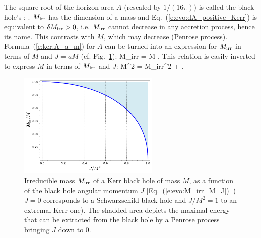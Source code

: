 The square root of the horizon area $A$ (rescaled by $1/(16\pi)$) is called
the black hole's :
\be \label{e:evo:Mirr_A}
    .
\ee
$M_{\rm irr}$ has the dimension of a mass and
Eq.~(\ref{e:evo:dA_positive_Kerr}) is equivalent to $\delta M_{\rm irr} > 0$,
i.e. $M_{\rm irr}$ cannot decrease in any accretion process,
hence its name. This contrasts with $M$, which may decrease (Penrose process).
Formula~(\ref{e:ker:A_a_m}) for $A$ can be turned into an expression
for $M_{\rm irr}$ in terms of $M$ and $J=aM$ (cf. Fig.~\ref{f:evo:irred_mass}):
\be \label{e:evo:M_irr_M_J}
    M_{\rm irr} = M  .
\ee
This relation is easily inverted to express $M$ in terms of $M_{\rm irr}$ and $J$:
\be \label{e:evo:M_M_irr_J}
    M^2 = M_{\rm irr}^2 +  .
\ee

\begin{figure}
\centerline{\includegraphics[width=0.6\textwidth]{evo_irred_mass.pdf}}
\caption[]{\label{f:evo:irred_mass} \footnotesize
Irreducible mass $M_{\rm irr}$ of a Kerr black hole of mass $M$, as a
function of the black hole angular momentum $J$ [Eq.~(\ref{e:evo:M_irr_M_J})]
($J = 0$ corresponds to a
Schwarzschild black hole and $J/M^2 = 1$ to an extremal Kerr one). The shadded
area depicts the maximal energy that can be extracted from the black hole by
a Penrose process bringing $J$ down to $0$.}
\end{figure}

